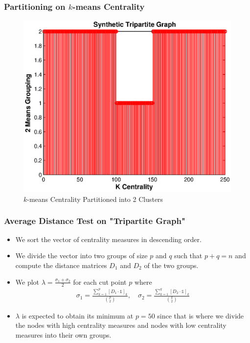 \documentclass{beamer}
\begin{document}
\begin{frame}
\frametitle{Partitioning on $k$-means Centrality}
\begin{figure}[h]
\begin{center}
\includegraphics[width=0.76\columnwidth]{kcent_kmeans}
\end{center}
\caption{$k$-means Centrality Partitioned into 2 Clusters}
\label{fig:K-mean cluster on centrality score}
\end{figure}
\end{frame}




\begin{frame}
     \frametitle{Average Distance Test on "Tripartite Graph"}
     \begin{itemize}
     \item We sort the vector of centrality measures in         descending order.
     \item We divide the vector into two groups of size $p$ and $q$ such that $p+q=n$ and compute the distance matrices $D_1$ and $D_2$ of the two groups.
     \item We plot $\lambda = \frac{\sigma_1 + \sigma_2}{2}$ for each cut point $p$ where
     \begin{align*}
      \sigma_1 = \frac{\sum_{k=1}^p [D_1 \cdot \mathds{1}]_k}{\binom{p}{2}},
      \quad
      \sigma_2 = \frac{\sum_{k=1}^q [D_2 \cdot \mathds{1}]_k}{\binom{q}{2}}
     \end{align*}
     
\item $\lambda$ is expected to obtain its minimum at $p=50$ since that is where we divide the nodes with high centrality measures and nodes with low centrality measures into their own groups.
\end{itemize}
\end{frame}
\end{document}
